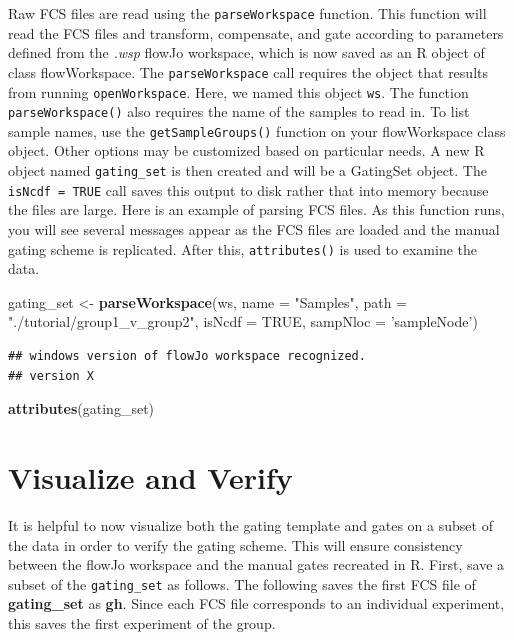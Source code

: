 \documentclass[]{book}
\newenvironment{Shaded}{\begin{snugshade}}{\end{snugshade}}
\newcommand{\DataTypeTok}[1]{\textcolor[rgb]{0.13,0.29,0.53}{#1}}
\newcommand{\KeywordTok}[1]{\textcolor[rgb]{0.13,0.29,0.53}{\textbf{#1}}}
\newcommand{\NormalTok}[1]{#1}
\newcommand{\OtherTok}[1]{\textcolor[rgb]{0.56,0.35,0.01}{#1}}
\newcommand{\StringTok}[1]{\textcolor[rgb]{0.31,0.60,0.02}{#1}}
\begin{document}
Raw FCS files are read using the \texttt{parseWorkspace} function. This function will read the FCS files and transform, compensate, and gate according to parameters defined from the \emph{.wsp} flowJo workspace, which is now saved as an R object of class flowWorkspace. The \texttt{parseWorkspace} call requires the object that results from running \texttt{openWorkspace}. Here, we named this object \texttt{ws}. The function \texttt{parseWorkspace()} also requires the name of the samples to read in. To list sample names, use the \texttt{getSampleGroups()} function on your flowWorkspace class object. Other options may be customized based on particular needs. A new R object named \texttt{gating\_set} is then created and will be a GatingSet object. The \texttt{isNcdf\ =\ TRUE} call saves this output to disk rather that into memory because the files are large. Here is an example of parsing FCS files. As this function runs, you will see several messages appear as the FCS files are loaded and the manual gating scheme is replicated. After this, \texttt{attributes()} is used to examine the data.

\begin{Shaded}
\begin{Highlighting}[]
\NormalTok{gating_set <-}\StringTok{ }\KeywordTok{parseWorkspace}\NormalTok{(ws, }\DataTypeTok{name =} \StringTok{"Samples"}\NormalTok{, }\DataTypeTok{path =} \StringTok{"./tutorial/group1_v_group2"}\NormalTok{, }\DataTypeTok{isNcdf =} \OtherTok{TRUE}\NormalTok{, }\DataTypeTok{sampNloc =} \StringTok{'sampleNode'}\NormalTok{)}
\end{Highlighting}
\end{Shaded}

\begin{verbatim}
## windows version of flowJo workspace recognized.
## version X
\end{verbatim}

\begin{Shaded}
\begin{Highlighting}[]
\KeywordTok{attributes}\NormalTok{(gating_set)}
\end{Highlighting}
\end{Shaded}

\hypertarget{visualize-and-verify}{%
\section{Visualize and Verify}\label{visualize-and-verify}}

It is helpful to now visualize both the gating template and gates on a subset of the data in order to verify the gating scheme. This will ensure consistency between the flowJo workspace and the manual gates recreated in R. First, save a subset of the \texttt{gating\_set} as follows. The following saves the first FCS file of \textbf{gating\_set} as \textbf{gh}. Since each FCS file corresponds to an individual experiment, this saves the first experiment of the group.
\end{document}
